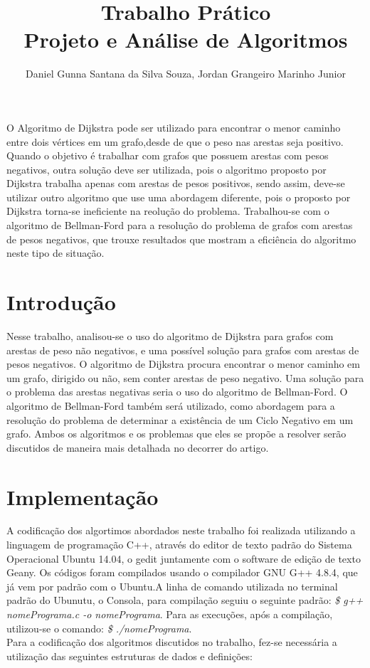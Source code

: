 \documentclass[12pt]{article}
\title{Trabalho Prático\\Projeto e Análise de Algoritmos}
\author{Daniel Gunna Santana da Silva Souza,  Jordan Grangeiro Marinho Junior}
\begin{document}
 

\maketitle

     
\begin{resumo} 
  O Algoritmo de Dijkstra pode ser utilizado para encontrar o menor caminho entre dois vértices em um grafo,desde de que o  peso nas arestas seja positivo. Quando o objetivo é trabalhar com grafos que possuem arestas com pesos negativos, outra solução deve ser utilizada, pois o algoritmo proposto por Dijkstra trabalha apenas com arestas de pesos positivos, sendo assim, deve-se utilizar  outro algoritmo que use uma abordagem diferente, pois o proposto por Dijkstra torna-se ineficiente na reolução do problema. Trabalhou-se com o algoritmo de Bellman-Ford para a resolução do problema de grafos com arestas de pesos negativos, que trouxe resultados que mostram a eficiência do algoritmo neste tipo de situação.
\end{resumo}


\section{Introdução}

Nesse trabalho, analisou-se o uso do algoritmo de Dijkstra para grafos com arestas
de peso não negativos, e uma possível solução para grafos com arestas de pesos negativos. O algoritmo de 
Dijkstra procura encontrar o menor caminho em um grafo, dirigido ou não,
sem conter arestas de peso negativo. Uma solução para o problema das arestas negativas seria o uso do algoritmo
de Bellman-Ford. O algoritmo de Bellman-Ford também será utilizado, como abordagem para a resolução do problema de determinar a existência de um Ciclo Negativo em um grafo. Ambos os algoritmos e os problemas que eles se propõe a resolver   serão discutidos de maneira mais detalhada no decorrer do artigo.

\section{Implementação} \label{sec:implementacao}
A codificação dos algortimos abordados neste trabalho foi realizada   utilizando a linguagem de programação C++, através do editor de texto padrão do Sistema Operacional Ubuntu 14.04, o gedit   juntamente com o software de edição de texto Geany. Os códigos foram compilados usando o compilador GNU G++ 4.8.4, que já vem por padrão com o Ubuntu.A linha de comando utilizada no terminal padrão do Ubunutu, o Consola, para compilação seguiu o seguinte padrão: \textit{\$ g++ nomePrograma.c -o nomePrograma}. Para as execuções, após a compilação, utilizou-se o comando: \textit{\$ ./nomePrograma}.
\\Para a codificação  dos algoritmos discutidos no trabalho, fez-se necessária a utilização das seguintes estruturas de dados e definições:
\end{document}
